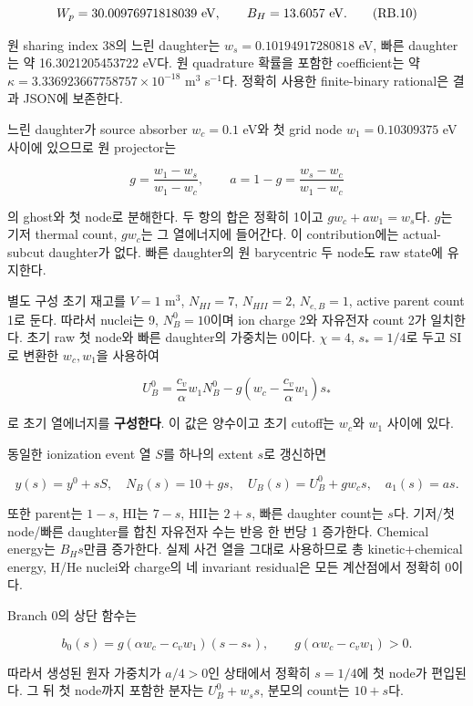 \documentclass[11pt,a4paper]{article}
\begin{document}
\[W_p=30.00976971818039\ {\rm eV},\qquad B_H=13.6057\ {\rm eV}.\tag{RB.10}\]

원 sharing index 38의 느린 daughter는 \(w_s=0.10194917280818\) eV, 빠른 daughter는 약 16.3021205453722 eV다. 원 quadrature 확률을 포함한 coefficient는 약 \(\kappa=3.336923667758757\times10^{-18}\) m\(^3\) s\(^{-1}\)다. 정확히 사용한 finite-binary rational은 결과 JSON에 보존한다.

느린 daughter가 source absorber \(w_c=0.1\) eV와 첫 grid node \(w_1=0.10309375\) eV 사이에 있으므로 원 projector는

\[g=\frac{w_1-w_s}{w_1-w_c},\qquad a=1-g=\frac{w_s-w_c}{w_1-w_c}\tag{RB.11}\]

의 ghost와 첫 node로 분해한다. 두 항의 합은 정확히 1이고 \(g w_c+a w_1=w_s\)다. \(g\)는 기저 thermal count, \(g w_c\)는 그 열에너지에 들어간다. 이 contribution에는 actual-subcut daughter가 없다. 빠른 daughter의 원 barycentric 두 node도 raw state에 유지한다.

별도 구성 초기 재고를 \(V=1\) m\(^3\), \(N_{HI}=7\), \(N_{HII}=2\), \(N_{e,B}=1\), active parent count 1로 둔다. 따라서 nuclei는 9, \(N_B^0=10\)이며 ion charge 2와 자유전자 count 2가 일치한다. 초기 raw 첫 node와 빠른 daughter의 가중치는 0이다. \(\chi=4\), \(s_*=1/4\)로 두고 SI로 변환한 \(w_c,w_1\)을 사용하여

\[U_B^0=\frac{c_v}{\alpha}w_1N_B^0-g\left(w_c-\frac{c_v}{\alpha}w_1\right)s_*\tag{RB.12}\]

로 초기 열에너지를 \textbf{구성한다}. 이 값은 양수이고 초기 cutoff는 \(w_c\)와 \(w_1\) 사이에 있다.

동일한 ionization event 열 \(S\)를 하나의 extent \(s\)로 갱신하면

\[y(s)=y^0+sS,\quad N_B(s)=10+gs,\quad U_B(s)=U_B^0+gw_cs,\quad a_1(s)=as.\tag{RB.13}\]

또한 parent는 \(1-s\), HI는 \(7-s\), HII는 \(2+s\), 빠른 daughter count는 \(s\)다. 기저/첫 node/빠른 daughter를 합친 자유전자 수는 반응 한 번당 1 증가한다. Chemical energy는 \(B_Hs\)만큼 증가한다. 실제 사건 열을 그대로 사용하므로 총 kinetic+chemical energy, H/He nuclei와 charge의 네 invariant residual은 모든 계산점에서 정확히 0이다.

Branch 0의 상단 함수는

\[b_0(s)=g(\alpha w_c-c_vw_1)(s-s_*),\qquad g(\alpha w_c-c_vw_1)>0.\tag{RB.14}\]

따라서 생성된 원자 가중치가 \(a/4>0\)인 상태에서 정확히 \(s=1/4\)에 첫 node가 편입된다. 그 뒤 첫 node까지 포함한 분자는 \(U_B^0+w_ss\), 분모의 count는 \(10+s\)다.
\end{document}

